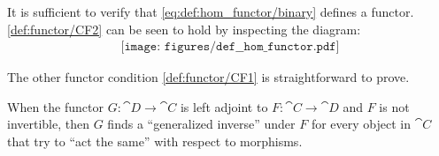 \begin{defproof}
  It is sufficient to verify that \eqref{eq:def:hom_functor/binary} defines a functor. \ref{def:functor/CF2} can be seen to hold by inspecting the diagram:
  \begin{equation}\label{eq:def:hom_functor/inv_composition}
    \begin{aligned}
      \texttt{[image: figures/def\_\_hom\_functor.pdf]}
    \end{aligned}
  \end{equation}

  The other functor condition \ref{def:functor/CF1} is straightforward to prove.
\end{defproof}

\begin{remark}\label{rem:adjoint_functors}\cite{StanfordPlato:category_theory}
  When the functor \( G: \cat{D} \to \cat{C} \) is left adjoint to \( F: \cat{C} \to \cat{D} \) and \( F \) is not invertible, then \( G \) finds a \enquote{generalized inverse} under \( F \) for every object in \( \cat{C} \) that try to \enquote{act the same} with respect to morphisms.
\end{remark}

